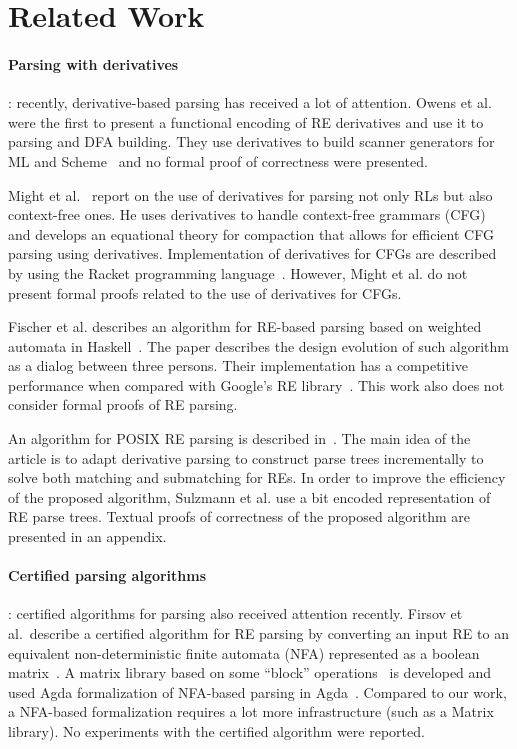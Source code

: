 \documentclass{llncs}
\begin{document}
\section{Related Work}\label{sec:related}

\paragraph{Parsing with derivatives}: recently, derivative-based parsing has
received a lot of attention. Owens et al. were the first to present a
functional encoding of RE derivatives and use it to parsing and DFA
building. They use derivatives to build scanner generators for ML and
Scheme~\cite{Owens2009} and no formal proof of correctness were
presented.

Might et al.~\cite{Might2011} report on
the use of derivatives for parsing not only RLs but also context-free
ones. He uses derivatives to handle context-free grammars (CFG) and
develops an equational theory for compaction that allows for efficient
CFG parsing using derivatives. Implementation of derivatives for CFGs
are described by using the Racket programming
language~\cite{Felleisen2013}. However, Might et al. do not present
formal proofs related to the use of derivatives for CFGs.

Fischer et al. describes an algorithm for RE-based parsing based on
weighted automata in Haskell~\cite{Fischer2010}.  The paper describes
the design evolution of such algorithm as a dialog between three
persons. Their implementation has a competitive performance when
compared with Google's RE library~\cite{re2}. This work also does not
consider formal proofs of RE parsing.

An algorithm for POSIX RE parsing is described
in~\cite{SulzmannL14}. The main idea of the article is to adapt
derivative parsing to construct parse trees incrementally to solve
both matching and submatching for REs. In order to improve the
efficiency of the proposed algorithm, Sulzmann et al. use a bit
encoded representation of RE parse trees. Textual proofs of
correctness of the proposed algorithm are presented in an appendix.

\paragraph{Certified parsing algorithms}: certified algorithms for
parsing also received attention recently. Firsov et al.~describe a
certified algorithm for RE parsing by converting an input RE to an
equivalent non-deterministic finite automata (NFA) represented as a
boolean matrix~\cite{FirsovU13}. A matrix library based on some
``block'' operations~\cite{MacedoO13} is developed and used Agda
formalization of NFA-based parsing in Agda~\cite{Norell2009}. Compared
to our work, a NFA-based formalization requires a lot more
infrastructure (such as a Matrix library). No experiments with the
certified algorithm were reported.
\end{document}
